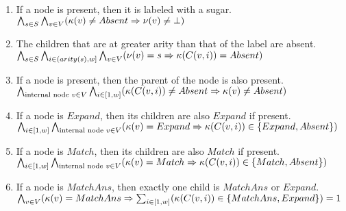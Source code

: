 \begin{enumerate}
\item If a node is present, then it is labeled with a sugar.\\
$
\bigwedge_{s \in S} \bigwedge_{v \in V} (\kappa(v) \neq Absent \Rightarrow \nu(v) \neq \bot )
$
\item

  The children that are at greater arity than that of the label
  are absent.\\
$
\bigwedge_{s \in S} \bigwedge_{i \in (arity(s),w] }\bigwedge_{v \in V} (\nu(v) = s \Rightarrow \kappa( C(v,i) ) = Absent )
$
\item If a node is present, then the parent of the node is also present.\\
  $
  \bigwedge_{{\text{internal node } v \in V}}
  \bigwedge_{i\in[1,w]} (\kappa(C(v,i) ) \neq Absent \Rightarrow \kappa( v ) \neq Absent )  
  $
\item If a node is $Expand$, then its children are also $Expand$ if present.\\
  $
\bigwedge_{i\in[1,w]} \bigwedge_{{\text{internal node } v \in V}} (\kappa(v) = Expand \Rightarrow \kappa(C(v,i)) \in \{Expand,Absent\}   )
$
\item If a node is $Match$, then its children are also $Match$ if present.\\
$
\bigwedge_{i\in[1,w]} \bigwedge_{{\text{internal node } v \in V}} (\kappa(v) = Match \Rightarrow \kappa(C(v,i)) \in \{Match,Absent\}   )
$
\item If a node is $MatchAns$, then exactly one child is $MatchAns$ or $Expand$.\\
\mbox{}\hspace{-5mm}  
$
\bigwedge_{v \in V} (\kappa(v) = MatchAns \Rightarrow \sum_{i\in[1,w]}( \kappa(C(v,i)) \in \{MatchAns,Expand\}) = 1
$
\end{enumerate}

